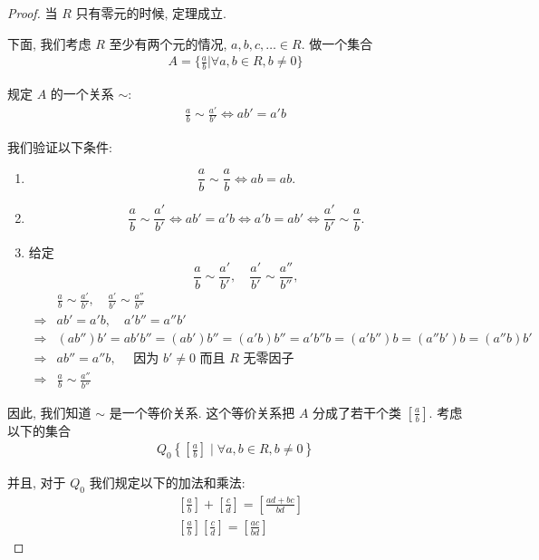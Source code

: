 \documentclass[utf8]{ctexbook}
\begin{document}
\begin{proof}
当 $R$ 只有零元的时候, 定理成立. 

下面, 我们考虑 $R$ 至少有两个元的情况, $a, b, c, \ldots \in R$. 做一个集合
\begin{align*}
A = \{ \frac{a}{b} | \forall a, b \in R, b \neq 0 \}
\end{align*}

规定 $A$ 的一个关系 $\sim$:
\begin{align*}
\frac{a}{b} 	\sim \frac{a'}{b'} \iff ab' = a' b
\end{align*}

我们验证以下条件:
\begin{enumerate}
\item{$$\frac{a}{b} \sim \frac{a}{b} \iff ab = ab . $$}
\item{$$ \frac{a}{b} \sim \frac{a'}{b'} \iff a b' = a' b \iff a'b = a b' \iff \frac{a'}{b'} \sim \frac{a}{b} . $$}
\item{给定 $$ \frac{a}{b} \sim \frac{a'}{b'} , \quad \frac{a'}{b'} \sim \frac{a''}{b''} , $$
\begin{align*}
& \frac{a}{b} \sim \frac{a'}{b'} , \quad \frac{a'}{b'} \sim \frac{a''}{b''}  \\
\Longrightarrow & ab' = a' b, \quad a' b'' = a'' b' \\
\Longrightarrow & (a b'') b' =  a b' b'' = (a b') b'' = (a' b) b'' = a' b'' b = (a' b'')b = (a'' b')b = (a'' b) b' \\
\Longrightarrow & a b '' = a'' b, \quad \mbox{ 因为 } b' \neq 0 \mbox{  而且  } R \mbox{  无零因子} \\
\Longrightarrow & \frac{a}{b} \sim \frac{a''}{b''}
\end{align*}
}
\end{enumerate}

因此, 我们知道 $\sim$ 是一个等价关系. 这个等价关系把 $A$ 分成了若干个类 $\left[ \frac{a}{b} \right]$. 考虑以下的集合
\begin{align*}
Q_0 \left \{ \left[ \frac{a}{b} \right]  \mid \forall a , b \in R , b \neq 0 \right \}
\end{align*}

并且, 对于 $Q_0$ 我们规定以下的加法和乘法:
\begin{align*}
& \left[ \frac{a}{b} \right] + \left[ \frac{c}{d} \right] = \left[ \frac{ad + bc }{bd} \right] \\
& \left[ \frac{a}{b} \right] \left[ \frac{c}{d} \right] = \left[ \frac{ac}{bd} \right]
\end{align*}


\end{proof}
\end{document}
